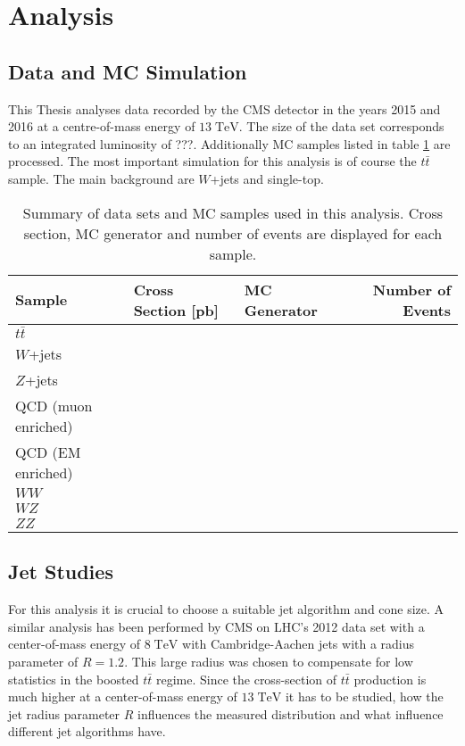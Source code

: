\section{Analysis}
\subsection{Data and MC Simulation}
	This Thesis analyses data recorded by the CMS detector in the years 2015 and 2016 at a centre-of-mass energy of $13\;\text{TeV}$. The size of the data set corresponds to an integrated luminosity of ???. Additionally MC samples listed in table \ref{MC_Tab} are processed. The most important simulation for this analysis is of course the $t\bar{t}$ sample. The main background are $W$+jets and single-top. 
\begin{landscape}
	\begin{table}
	\centering
	 \begin{tabular}{|l|l|l|r|}
	 	\hline
	 	Sample & Cross Section [pb] & MC Generator & Number of Events \\
	 	\hline
	 	$t\bar{t}$ & & & \\
		\hline
	 	$W$+jets & & & \\
	 	$Z$+jets & & & \\
	 	QCD (muon enriched) & & & \\
	 	QCD (EM enriched) & & & \\
	 	$WW$ & & & \\
	 	$WZ$ & & & \\
	 	$ZZ$ & & & \\
	 	 \hline
	 \end{tabular}
	\caption{Summary of data sets and MC samples used in this analysis. Cross section, MC generator and number of events are displayed for each sample.}
	\label{MC_Tab}	
	\end{table}
	\end{landscape}
	
	
\subsection{Jet Studies}
	For this analysis it is crucial to choose a suitable jet algorithm and cone size. A similar analysis has been performed by CMS on LHC's 2012 data set with a center-of-mass energy of $8\;\text{TeV}$ with Cambridge-Aachen jets with a radius parameter of $R=1.2$. This large radius was chosen to compensate for low statistics in the boosted $t\bar{t}$ regime. Since the cross-section of $t\bar{t}$ production is much higher at a center-of-mass energy of $13\;\text{TeV}$ it has to be studied, how the jet radius parameter $R$ influences the measured distribution and what influence different jet algorithms have.
